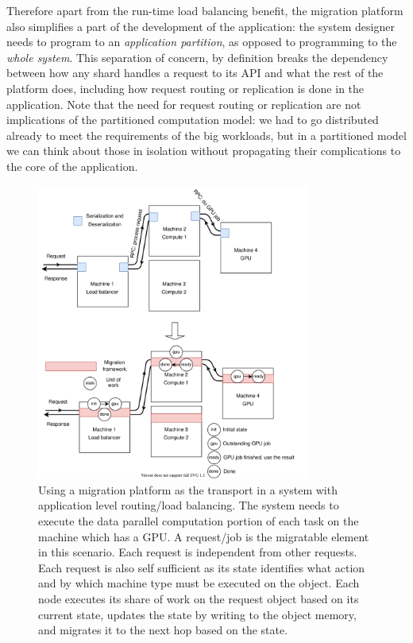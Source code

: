 Therefore apart from the run-time load balancing benefit, the
    migration platform also simplifies a part of the development of the
    application: the system designer needs to program to an
    \emph{application partition}, as opposed to programming to the
    \emph{whole system}. This separation of concern,
    by definition breaks the dependency between how
    any shard handles a request to its API and what the rest of the
    platform does, including how request routing or replication is done
    in the application. Note that the need for request routing or
    replication are not implications of the partitioned computation
    model: we had to go distributed already to meet the requirements of
    the big workloads, but in a partitioned model we can think about those
    in isolation without propagating their complications to the
    core of the application.


\begin{figure}[tp]
\centering

\includegraphics[width=0.8\textwidth]{migration-transport.drawio}
\caption{
    Using a migration platform as the transport in a system with
    application level routing/load balancing. The system needs to execute
    the data parallel computation portion of each task on the machine
    which has a GPU. A request/job is the
    migratable element in this scenario. Each request is independent
    from other requests. Each request is also self sufficient as its
    state identifies what action and by which machine type must be
    executed on the object. Each node executes its share of work
    on the request object based on its current state, updates the state by
    writing to the object memory, and migrates it to the next hop based
    on the state.
}
\label{fig:migrationtransport}
\end{figure}

